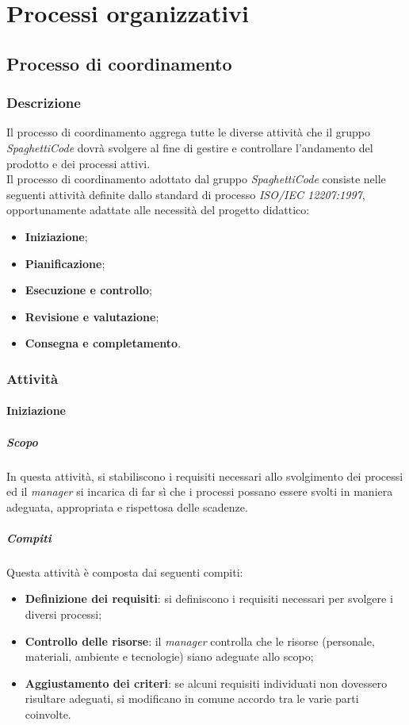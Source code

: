 \section{Processi organizzativi}
\label{sec:processi_organizativi}

\subsection{Processo di coordinamento}

\subsubsection{Descrizione}
Il processo di coordinamento aggrega tutte le diverse attività che il gruppo \emph{SpaghettiCode} dovrà svolgere al fine di gestire e controllare l'andamento del prodotto e dei processi attivi.\\

Il processo di coordinamento adottato dal gruppo \emph{SpaghettiCode} consiste nelle seguenti attività definite dallo standard di processo \emph{ISO/IEC 12207:1997}, opportunamente adattate alle necessità del progetto didattico:
\begin{itemize}
    \item \textbf{Iniziazione};
    \item \textbf{Pianificazione};
    \item \textbf{Esecuzione e controllo};
    \item \textbf{Revisione e valutazione};
    \item \textbf{Consegna e completamento}.
\end{itemize}

\subsubsection{Attività}


\paragraph{Iniziazione}
\label{par:iniziazione}
\subparagraph{Scopo}
\label{par:iniziazione:scopo}
In questa attività, si stabiliscono i requisiti necessari allo svolgimento dei processi ed il \emph{manager} si incarica di far sì che i processi possano essere svolti in maniera adeguata, appropriata e rispettosa delle scadenze.\\
\subparagraph{Compiti}
\label{par:iniziazione:compiti}
Questa attività è composta dai seguenti compiti:
\begin{itemize}
    \item \textbf{Definizione dei requisiti}: si definiscono i requisiti necessari per svolgere i diversi processi;
    \item \textbf{Controllo delle risorse}: il \emph{manager} controlla che le risorse (personale, materiali, ambiente e tecnologie) siano adeguate allo scopo;
    \item \textbf{Aggiustamento dei criteri}: se alcuni requisiti individuati non dovessero risultare adeguati, si modificano in comune accordo tra le varie parti coinvolte.
\end{itemize}

